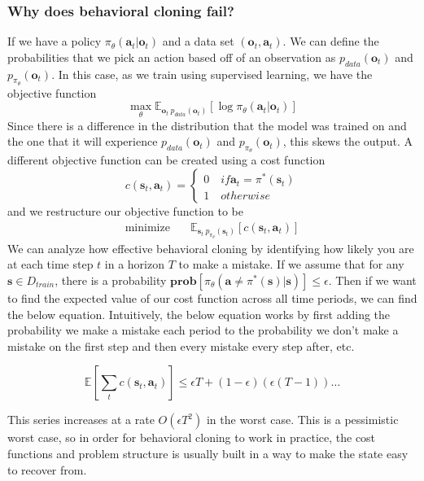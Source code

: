 \subsubsection{Why does behavioral cloning fail?}
If we have a policy $\pi_\theta( \textbf{a}_t | \textbf{o}_t)$ and a data set $(\textbf{o}_t, \textbf{a}_t)$. We can define the probabilities that we pick an action based off of an observation as $p_{data}(\textbf{o}_t)$ and $p_{\pi_\theta} (\textbf{o}_t)$. In this case, as we train using supervised learning, we have the objective function 
\begin{equation}
     \max_\theta \mathbb{E}_{\textbf{o}_t ~ p_{data}(\textbf{o}_t)} [\log \pi_\theta(\textbf{a}_t | \textbf{o}_t)]
\end{equation}
Since there is a difference in the distribution that the model was trained on and the one that it will experience $p_{data}(\textbf{o}_t)$ and $p_{\pi_\theta} (\textbf{o}_t)$, this skews the output. A different objective function can be created using a cost function
\begin{equation}
    c(\textbf{s}_t, \textbf{a}_t) = 
    \begin{cases}
        0 \quad if \textbf{a}_t = \pi^*(\textbf{s}_t)\\ 
        1 \quad otherwise
    \end{cases}
\end{equation}
and we restructure our objective function to be
\begin{align}
  \text{minimize} & \quad \mathbb{E}_{\textbf{s}_t ~ p_{\pi_\theta}(\textbf{s}_t)} [c(\textbf{s}_t, \textbf{a}_t)]
\end{align}
We can analyze how effective behavioral cloning by identifying how likely you are at each time step $t$ in a horizon $T$ to make a mistake. If we assume that for any $\textbf{s} \in D_{train}$, there is a probability $\textbf{prob} [\pi_\theta(\textbf{a} \neq \pi^* (\textbf{s}) | \textbf{s})] \leq \epsilon$. Then if we want to find the expected value of our cost function across all time periods, we can find the below equation. Intuitively, the below equation works by first adding the probability we make a mistake each period to the probability we don't make a mistake on the first step and then every mistake every step after, etc.

\begin{equation}
    \mathbb{E}[\sum_{t} c(\textbf{s}_t, \textbf{a}_t)] \leq \epsilon T + (1-\epsilon)(\epsilon(T-1)) \dots 
\end{equation}

This series increases at a rate $O(\epsilon T^2)$ in the worst case. This is a pessimistic worst case, so in order for behavioral cloning to work in practice, the cost functions and problem structure is usually built in a way to make the state easy to recover from.